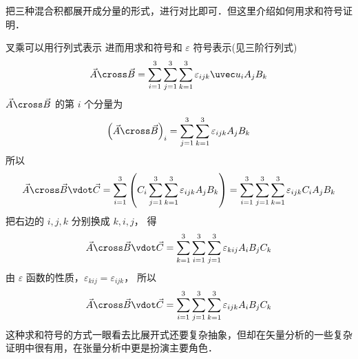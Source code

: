 
把三种混合积都展开成分量的形式，进行对比即可．但这里介绍如何用求和符号证明．

叉乘可以用行列式表示 进而用求和符号和 $\varepsilon$ 符号表示(见三阶行列式)
\begin{equation}
\vec A \cross \vec B = \sum\limits_{i = 1}^3 {\sum\limits_{j = 1}^3 {\sum\limits_{k = 1}^3 {{\varepsilon _{ijk}}{{\uvec u}_i}{A_j}{B_k}} } } 
\end{equation}
 $\vec A \cross \vec B$ 的第 $i$ 个分量为
 \begin{equation}
{\left( {\vec A \cross \vec B} \right)_i} = \sum\limits_{j = 1}^3 {\sum\limits_{k = 1}^3 {{\varepsilon _{ijk}}{A_j}{B_k}} } 
\end{equation}
所以
 \begin{equation}
\vec A \cross \vec B \vdot \vec C = \sum\limits_{i = 1}^3 {\left( {{C_i}\sum\limits_{j = 1}^3 {\sum\limits_{k = 1}^3 {{\varepsilon _{ijk}}{A_j}{B_k}} } } \right)}  = \sum\limits_{i = 1}^3 {\sum\limits_{j = 1}^3 {\sum\limits_{k = 1}^3 {{\varepsilon _{ijk}}{C_i}{A_j}{B_k}} } } 
\end{equation} 
把右边的 $i,j,k$ 分别换成 $k,i,j$， 得
 \begin{equation}
\vec A \cross \vec B \vdot \vec C = \sum\limits_{k = 1}^3 {\sum\limits_{i = 1}^3 {\sum\limits_{j = 1}^3 {{\varepsilon _{kij}}{A_i}{B_j}{C_k}} } } 
\end{equation}  
由 $\varepsilon$ 函数的性质，${\varepsilon _{kij}} = {\varepsilon _{ijk}}$， 所以
 \begin{equation}
\vec A \cross \vec B \vdot \vec C = \sum\limits_{i = 1}^3 {\sum\limits_{j = 1}^3 {\sum\limits_{k = 1}^3 {{\varepsilon _{ijk}}{A_i}{B_j}{C_k}} } }  
\end{equation}   
这种求和符号的方式一眼看去比展开式还要复杂抽象，但却在矢量分析的一些复杂证明中很有用，在张量分析中更是扮演主要角色．
